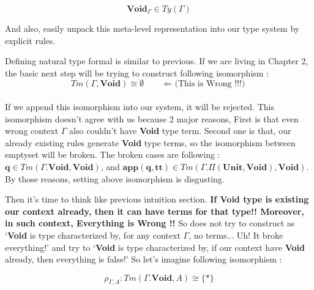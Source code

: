 \documentclass[12pt, a4paper, openany, twoside]{book}
\theoremstyle{definition}
\theoremstyle{remark}
\theoremstyle{plain}
\numberwithin{equation}{section}
\begin{document}
\begin{tcolorbox}[colback=yellow!10!white,colframe=green!75!black,title=Construction 3.2.1. Natural Type Formal]\hypertarget{const 3.2.1.}{}

\[\mathbf{Void}_\Gamma \in Ty(\Gamma)\]

\end{tcolorbox}
\vspace{2mm}
And also, easily unpack this meta-level representation into our type system by explicit rules. 
\begin{tcolorbox}[colback=yellow!10!white,colframe=green!75!black,title=Construction 3.2.2.]\hypertarget{const 3.2.2.}{}
\end{tcolorbox}
\vspace{4mm}

Defining natural type formal is similar to previous. If we are living in Chapter 2, the basic next step will be 
trying to construct following isomorphism : 
\[Tm(\Gamma, \mathbf{Void}) \cong \emptyset \qquad \text{$\Leftarrow$ (This is Wrong !!!)}\]
\\
If we append this isomorphism into our system, it will be rejected. This isomorphism doesn't agree with us
because 2 major reasons, First is that even wrong context $\Gamma$ also couldn't have \textbf{Void} type term. 
Second one is that, our already existing rules generate \textbf{Void} type terms, so the isomorphism between emptyset will be broken. 
The broken cases are following : $\mathbf{q} \in Tm(\Gamma.\mathbf{Void}, \mathbf{Void})$, and $\mathbf{app}(\mathbf{q}, \mathbf{tt}) \in Tm(\Gamma.\Pi(\mathbf{Unit}, \mathbf{Void}), \mathbf{Void})$. 
By those reasons, setting above isomorphism is disgusting. 

Then it's time to think like previous intuition section. \textbf{If Void type is existing our context already, then 
it can have terms for that type!! Moreover, in such context, Everything is Wrong !!} So does not try to construct as 
\lq \textbf{Void} is type characterized by, for any context $\Gamma$, no terms... Uh! It broke everything!' and 
try to \lq \textbf{Void} is type characterized by, if our context have \textbf{Void} already, then everything is false!' 
So let's imagine following isomorphism : 
\begin{tcolorbox}[colback=yellow!10!white,colframe=green!75!black,title=Construction 3.2.3. Natural Term Isomorphism]\hypertarget{const 3.2.3.}{}
\[\rho_{\Gamma, A} : Tm(\Gamma.\mathbf{Void}, A) \cong \{*\}\] 
\end{tcolorbox}
\end{document}
